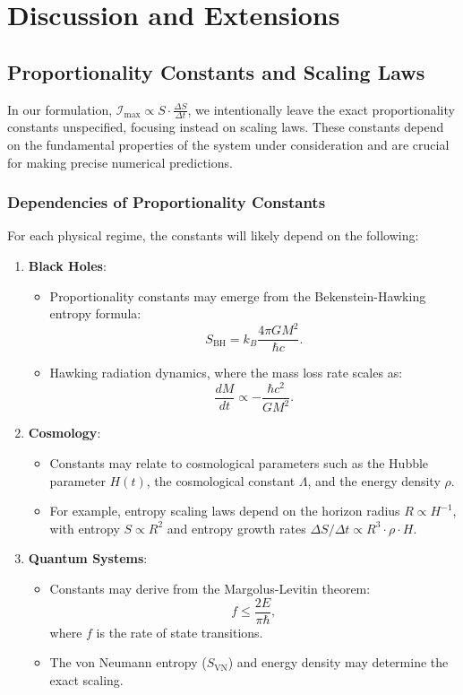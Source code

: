\documentclass[12pt]{article}
\begin{document}
\section{Discussion and Extensions}

\subsection{Proportionality Constants and Scaling Laws}
In our formulation, \( \mathcal{I}_{\text{max}} \propto S \cdot \frac{\Delta S}{\Delta t} \), we intentionally leave the exact proportionality constants unspecified, focusing instead on scaling laws. These constants depend on the fundamental properties of the system under consideration and are crucial for making precise numerical predictions.

\subsubsection*{Dependencies of Proportionality Constants}
For each physical regime, the constants will likely depend on the following:
\begin{enumerate}
    \item \textbf{Black Holes}:
    \begin{itemize}
        \item Proportionality constants may emerge from the Bekenstein-Hawking entropy formula:
        \[
        S_{\text{BH}} = k_B \frac{4 \pi G M^2}{\hbar c}.
        \]
        \item Hawking radiation dynamics, where the mass loss rate scales as:
        \[
        \frac{dM}{dt} \propto -\frac{\hbar c^2}{G M^2}.
        \]
    \end{itemize}
    \item \textbf{Cosmology}:
    \begin{itemize}
        \item Constants may relate to cosmological parameters such as the Hubble parameter \( H(t) \), the cosmological constant \( \Lambda \), and the energy density \( \rho \).
        \item For example, entropy scaling laws depend on the horizon radius \( R \propto H^{-1} \), with entropy \( S \propto R^2 \) and entropy growth rates \( \Delta S / \Delta t \propto R^3 \cdot \rho \cdot H \).
    \end{itemize}
    \item \textbf{Quantum Systems}:
    \begin{itemize}
        \item Constants may derive from the Margolus-Levitin theorem:
        \[
        f \leq \frac{2E}{\pi \hbar},
        \]
        where \( f \) is the rate of state transitions.
        \item The von Neumann entropy (\( S_{\text{VN}} \)) and energy density may determine the exact scaling.
    \end{itemize}
\end{enumerate}
\end{document}
